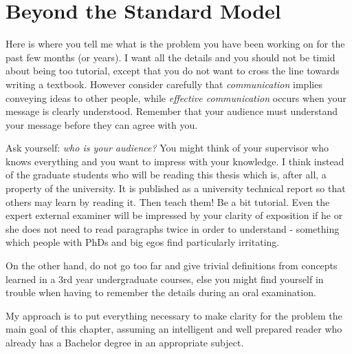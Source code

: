 \section{Beyond the Standard Model}









































Here is where you tell me what is the problem you have been working on for the past few months (or years). I want all the details and you should not be timid about being too tutorial, except that you do not want to cross the line towards writing a textbook. However consider carefully that \textit{communication} implies conveying ideas to other people, while \textit{effective communication} occurs when your message is clearly understood. Remember that your audience must understand your message before they can agree with you.

Ask yourself:
\textit{who is your audience?} You might think of your supervisor who knows everything and you want to impress with your knowledge. I think instead of the graduate students who will be reading this thesis which is, after all, a property of the university. It is published as a university technical report so that others may learn by reading it. Then teach them! Be a bit tutorial. Even the expert external examiner will be impressed by your clarity of exposition if he or she does not need to read paragraphs twice in order to understand - something which people with PhDs and big egos find particularly irritating.

On the other hand, do not go too far and give trivial definitions from concepts learned in a 3rd year undergraduate courses, else you might find yourself in trouble when having to remember the details during an oral examination.

My approach is to put everything necessary to make clarity for
the problem the main goal of this chapter, assuming an intelligent and well prepared reader who already has a Bachelor degree in an appropriate subject.

